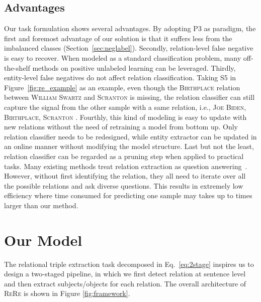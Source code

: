 \documentclass[11pt,a4paper]{article}
\newcommand{\mymethod}[0]{\textsc{ReRe} }
\begin{document}
\subsection{Advantages}
Our task formulation shows several advantages.
By adopting P3 as paradigm, the first and foremost advantage of our solution is that it suffers less from the imbalanced classes (Section~\ref{sec:neglabel}).
Secondly, relation-level false negative is easy to recover.
When modeled as a standard classification problem, many off-the-shelf methods on positive unlabeled learning can be leveraged.
Thirdly, entity-level false negatives do not affect relation classification.
Taking S5 in Figure~\ref{fig:re_example} as an example, even though the \textsc{Birthplace} relation between \textsc{William Swartz} and \textsc{Scranton} is missing, the relation classifier can still capture the signal from the other sample with a same relation, i.e.,  \textsc{Joe Biden, Birthplace, Scranton} .
Fourthly, this kind of modeling is easy to update with new relations without the need of retraining a model from bottom up.
Only relation classifier needs to be redesigned, while entity extractor can be updated in an online manner without modifying the model structure.
Last but not the least, relation classifier can be regarded as a pruning step when applied to practical tasks. Many existing methods treat relation extraction as question answering~\cite{Li2019EntityRelationEA,Zhao2020AskingEA}. 
However, without first identifying the relation, they all need to iterate over all the possible relations and ask diverse questions.
This results in extremely low efficiency where time consumed for predicting one sample may takes up to  times larger than our method.














\section{Our Model}
\label{sec:model}

The relational triple extraction task decomposed in Eq.~\eqref{eq:2stage} inspires us to design a two-staged pipeline, in which we first detect relation at sentence level and then extract subjects/objects for each relation.
The overall architecture of \mymethod is shown in Figure \ref{fig:framework}.
\end{document}
